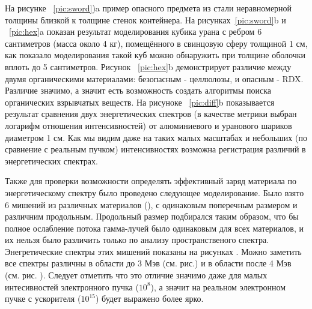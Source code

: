 \documentclass[a4paper]{panl}
\begin{document}
На рисунке ~\ref{pic:sword})a пример опасного предмета из стали неравномерной толщины близкой к толщине стенок контейнера. На рисунках~\ref{pic:sword}b и ~\ref{pic:hex}a  показан результат  моделирования кубика урана с ребром 6 сантиметров (масса около 4 кг), помещённого в свинцовую сферу толщиной 1 см, как показало моделирования такой куб можно обнаружить при толщине оболочки вплоть до 5 сантиметров. Рисунок ~\ref{pic:hex}b демонстрирует различие между двумя органическими материалами: безопасным - целлюлозы, и опасным  - RDX. Различие значимо, а значит есть возможность создать алгоритмы поиска органических взрывчатых веществ. На рисуноке ~\ref{pic:diff}b  показывается результат сравнения двух энергетических спектров (в  качестве метрики выбран логарифм отношения интенсивностей) от алюминиевого и уранового шариков диаметром 1 см. Как мы видим даже на таких малых масштабах и небольших (по сравнение с реальным пучком) интенсивностях возможна регистрация различий в энергетических спектрах.

Также для проверки возможности определять эффективный заряд материала по энергетическому спектру было проведено
следующее моделирование. Было взято 6 мишений из различных материалов (), с одинаковым поперечным размером и
 различним продольным. Продольный размер подбирался таким образом, что бы полное ослабление потока гамма-лучей было
одинаковым для всех материалов, и их нельзя было различить только по анализу пространственого спектра.
Энегретические спектры этих мишений показаны на рисунках . Можно заметить все спектры различны в области до 3 Мэв
 (см. рис.) и в области после 4 Мэв (см. рис. ). Следует отметить что это отличие значимо даже для малых интесивностей
электронного  пучка ($10^8$), а значит на реальном электронном пучке с ускорителя ($10^{15}$) будет выражено более ярко.
\end{document}

